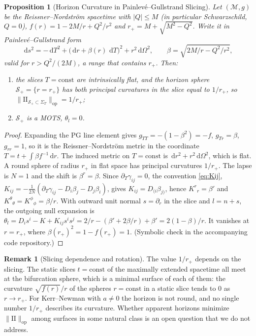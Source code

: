 \documentclass[11pt,reqno]{amsart}
\newtheorem{proposition}[theorem]{Proposition}
\theoremstyle{definition}
\newtheorem{remark}[theorem]{Remark}
\providecommand{\II}{\mathrm{I\!I}}
\newcommand{\op}{\mathrm{op}}
\providecommand{\dif}{\,\mathrm{d}}
\numberwithin{equation}{section}
\providecommand{\II}{\mathrm{II}}
\begin{document}
\begin{proposition}[Horizon Curvature in Painlev\'e--Gullstrand Slicing]
\label{prop:rn_horizon}
Let $(\mathcal{M}, g)$ be the Reissner--Nordstr\"om spacetime with $|Q| \le M$ (in particular Schwarzschild, $Q = 0$), $f(r) = 1 - 2M/r + Q^2/r^2$ and $r_+ = M + \sqrt{M^2 - Q^2}$. Write it in Painlev\'e--Gullstrand form
\[
\dif s^2 = -\dif T^2 + \big(\dif r + \beta(r)\, \dif T\big)^2 + r^2 \dif\Omega^2, \qquad \beta = \sqrt{2M/r - Q^2/r^2},
\]
valid for $r > Q^2/(2M)$, a range that contains $r_+$. Then:
\begin{enumerate}
    \item the slices $T = \text{const}$ are intrinsically flat, and the horizon sphere $\mathcal{S}_+ = \{r = r_+\}$ has both principal curvatures in the slice equal to $1/r_+$, so $\|\II_{\mathcal{S}_+ \subset \Sigma_T}\|_{\op} = 1/r_+$;
    \item $\mathcal{S}_+$ is a MOTS, $\theta_l = 0$.
\end{enumerate}
\end{proposition}
\begin{proof}
Expanding the PG line element gives $g_{TT} = -(1 - \beta^2) = -f$, $g_{Tr} = \beta$, $g_{rr} = 1$, so it is the Reissner--Nordstr\"om metric in the coordinate $T = t + \int \beta f^{-1}\dif r$. The induced metric on $T = \text{const}$ is $\dif r^2 + r^2 \dif\Omega^2$, which is flat. A round sphere of radius $r_+$ in flat space has principal curvatures $1/r_+$. The lapse is $N = 1$ and the shift is $\beta^r = \beta$. Since $\partial_T \gamma_{ij} = 0$, the convention \eqref{eq:Kij}, $K_{ij} = -\frac{1}{2N}(\partial_T\gamma_{ij} - D_i\beta_j - D_j\beta_i)$, gives $K_{ij} = D_{(i}\beta_{j)}$, hence $K^r{}_r = \beta'$ and $K^\theta{}_\theta = K^\phi{}_\phi = \beta/r$. With outward unit normal $s = \partial_r$ in the slice and $l = n + s$, the outgoing null expansion is $\theta_l = D_i s^i - K + K_{ij}s^is^j = 2/r - (\beta' + 2\beta/r) + \beta' = 2(1 - \beta)/r$. It vanishes at $r = r_+$, where $\beta(r_+)^2 = 1 - f(r_+) = 1$. (Symbolic check in the accompanying code repository.)
\end{proof}

\begin{remark}[Slicing dependence and rotation]
The value $1/r_+$ depends on the slicing. The static slices $t = \text{const}$ of the maximally extended spacetime all meet at the bifurcation sphere, which is a minimal surface of each of them: the curvature $\sqrt{f(r)}/r$ of the spheres $r = \text{const}$ in a static slice tends to $0$ as $r \to r_+$. For Kerr--Newman with $a \ne 0$ the horizon is not round, and no single number $1/r_+$ describes its curvature. Whether apparent horizons minimize $\|\II\|_{\op}$ among surfaces in some natural class is an open question that we do not address.
\end{remark}
\end{document}
